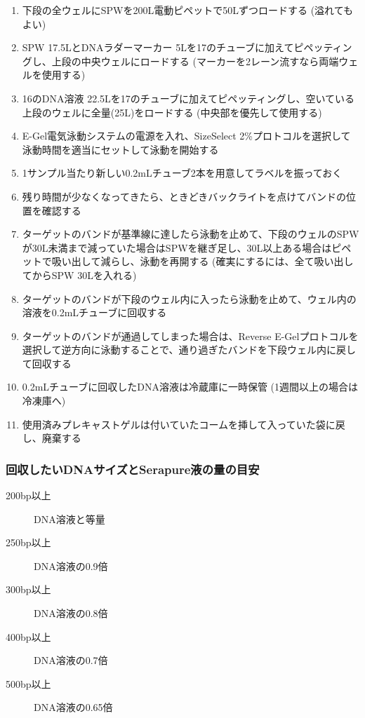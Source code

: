 \documentclass[titlepage,10pt,a4paper,uplatex]{jsbook}
\begin{document}
\begin{enumerate}
\item 下段の全ウェルにSPWを200{\textmu}L電動ピペットで50{\textmu}Lずつロードする (溢れてもよい)
\item SPW 17.5{\textmu}LとDNAラダーマーカー 5{\textmu}Lを17のチューブに加えてピペッティングし、上段の中央ウェルにロードする (マーカーを2レーン流すなら両端ウェルを使用する)
\item 16のDNA溶液 22.5{\textmu}Lを17のチューブに加えてピペッティングし、空いている上段のウェルに全量(25{\textmu}L)をロードする (中央部を優先して使用する)
\item E-Gel電気泳動システムの電源を入れ、SizeSelect 2\%プロトコルを選択して泳動時間を適当にセットして泳動を開始する
\item 1サンプル当たり新しい0.2mLチューブ2本を用意してラベルを振っておく
\item 残り時間が少なくなってきたら、ときどきバックライトを点けてバンドの位置を確認する
\item ターゲットのバンドが基準線に達したら泳動を止めて、下段のウェルのSPWが30{\textmu}L未満まで減っていた場合はSPWを継ぎ足し、30{\textmu}L以上ある場合はピペットで吸い出して減らし、泳動を再開する (確実にするには、全て吸い出してからSPW 30{\textmu}Lを入れる)
\item ターゲットのバンドが下段のウェル内に入ったら泳動を止めて、ウェル内の溶液を0.2mLチューブに回収する
\item ターゲットのバンドが通過してしまった場合は、Reverse E-Gelプロトコルを選択して逆方向に泳動することで、通り過ぎたバンドを下段ウェル内に戻して回収する
\item 0.2mLチューブに回収したDNA溶液は冷蔵庫に一時保管 (1週間以上の場合は冷凍庫へ)
\item 使用済みプレキャストゲルは付いていたコームを挿して入っていた袋に戻し、廃棄する
\end{enumerate}

\subsubsection{回収したいDNAサイズとSerapure液の量の目安}
\begin{description}
\item[200bp以上] DNA溶液と等量
\item[250bp以上] DNA溶液の0.9倍
\item[300bp以上] DNA溶液の0.8倍
\item[400bp以上] DNA溶液の0.7倍
\item[500bp以上] DNA溶液の0.65倍
\end{description}
\end{document}
